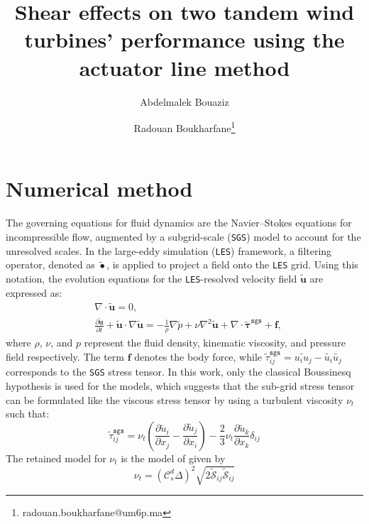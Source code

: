 \documentclass[11pt,a4paper]{article}
\title{Shear effects on two tandem wind turbines' performance using the actuator line method}
\author[1]{Abdelmalek Bouaziz}
\author[1]{Radouan Boukharfane\thanks{radouan.boukharfane@um6p.ma}}
\affil[1]{College of Computing, Mohammed VI Polytechnic University (UM6P), Benguerir, Morocco}
\date{}
\begin{document}
\maketitle

\section{Numerical method}

The governing equations for fluid dynamics are the Navier–Stokes equations for incompressible flow, augmented by a subgrid-scale (\texttt{SGS}) model to account for the unresolved scales. In the large-eddy simulation (\texttt{LES}) framework, a filtering operator, denoted as $\widetilde{\bullet}$, is applied to project a field onto the \texttt{LES} grid. 
%
Using this notation, the evolution equations for the \texttt{LES}-resolved velocity field $\widetilde{\boldsymbol{u}}$ are expressed as:
%
%
\begin{align}
&\nabla \cdot \widetilde{\boldsymbol{u}} = 0, \label{eq:mass_conservation} \\
&\frac{\partial \widetilde{\boldsymbol{u}}}{\partial t} + \widetilde{\boldsymbol{u}} \cdot \nabla \widetilde{\boldsymbol{u}} = 
-\frac{1}{\rho} \nabla \widetilde{p} + \nu \nabla^2 \widetilde{\boldsymbol{u}} 
+ \nabla \cdot \widetilde{\boldsymbol{\tau}}^{\texttt{sgs}} + \boldsymbol{f}, \label{eq:momentum_conservation}
\end{align}
%
where $\rho$, $\nu$, and $p$ represent the fluid density, kinematic viscosity, and pressure field respectively. The term $\boldsymbol{f}$ denotes the body force, while $\widetilde{\tau}_{ij}^{\texttt{sgs}}=\widetilde{u_iu_j}-\widetilde{u_i}\widetilde{u_j}$ corresponds to the \texttt{SGS} stress tensor.
%
In this work, only the classical Boussinesq hypothesis \citep{boussinesq1877essai} is used for the models, which suggests that the sub-grid stress tensor can be formulated like the viscous stress tensor by using a turbulent viscosity $\nu_t$ such that:
\begin{equation}
\widetilde{\tau}_{ij}^{\texttt{sgs}}=\nu_t\left(\frac{\partial\widetilde{u}_i}{\partial x_j}-\frac{\partial\widetilde{u}_j}{\partial x_i}\right)-\frac23\nu_t\frac{\partial\widetilde{u}_k}{\partial x_k}\delta_{ij}
\end{equation}
%
The retained model for $\nu_t$ is the model of \citet{germano1991dynamic} given by 
\begin{equation}
\nu_t = \left(\mathcal{C}^d_s\Delta\right)^2\sqrt{2\widetilde{\mathcal{S}}_{ij}\widetilde{\mathcal{S}}_{ij}}
\end{equation}
\end{document}
